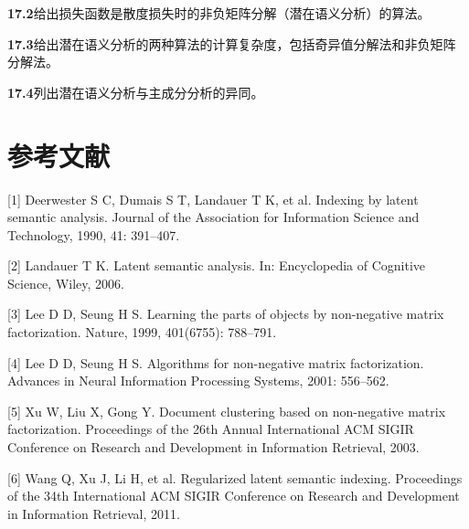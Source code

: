 \documentclass[UTF8,12pt,a4paper,fontset=fandol]{ctexart}
\begin{document}
\noindent\textbf{17.2}\quad 给出损失函数是散度损失时的非负矩阵分解（潜在语义分析）的算法。

\noindent\textbf{17.3}\quad 给出潜在语义分析的两种算法的计算复杂度，包括奇异值分解法和非负矩阵分解法。

\noindent\textbf{17.4}\quad 列出潜在语义分析与主成分分析的异同。

\section*{参考文献}

[1] Deerwester S C, Dumais S T, Landauer T K, et al. Indexing by latent semantic analysis. Journal of the Association for Information Science and Technology, 1990, 41: 391--407.

[2] Landauer T K. Latent semantic analysis. In: Encyclopedia of Cognitive Science, Wiley, 2006.

[3] Lee D D, Seung H S. Learning the parts of objects by non-negative matrix factorization. Nature, 1999, 401(6755): 788--791.

[4] Lee D D, Seung H S. Algorithms for non-negative matrix factorization. Advances in Neural Information Processing Systems, 2001: 556--562.

[5] Xu W, Liu X, Gong Y. Document clustering based on non-negative matrix factorization. Proceedings of the 26th Annual International ACM SIGIR Conference on Research and Development in Information Retrieval, 2003.

[6] Wang Q, Xu J, Li H, et al. Regularized latent semantic indexing. Proceedings of the 34th International ACM SIGIR Conference on Research and Development in Information Retrieval, 2011.
\end{document}
